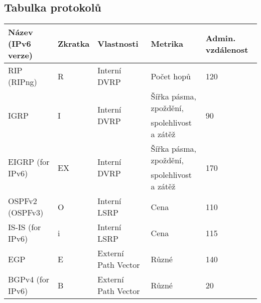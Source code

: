 \subsection{Tabulka protokolů}
\begin{tabularx}{\linewidth}{l|l|l|l|l}
  \textbf{Název (IPv6 verze)}           & \textbf{Zkratka}        & \textbf{Vlastnosti}               & \textbf{Metrika}       & \textbf{Admin. vzdálenost} \\
  \hline
  RIP (RIPng)                           & R                       & Interní DVRP                      & Počet hopů             & 120                        \\
  \hline
  \multirow{2}{8em}{{IGRP}}             & \multirow{2}{5em}{{I}}  & \multirow{2}{8em}{{Interní DVRP}} & Šířka pásma, zpoždění, & \multirow{2}{5em}{{90}}    \\
                                        &                         &                                   & spolehlivost a zátěž                                \\
  \hline
  \multirow{2}{8em}{{EIGRP (for IPv6)}} & \multirow{2}{5em}{{EX}} & \multirow{2}{8em}{{Interní DVRP}} & Šířka pásma, zpoždění, & \multirow{2}{5em}{{170}}   \\
                                        &                         &                                   & spolehlivost a zátěž                                \\
  \hline
  OSPFv2 (OSPFv3)                       & O                       & Interní LSRP                      & Cena                   & 110                        \\
  \hline
  IS-IS (for IPv6)                      & i                       & Interní LSRP                      & Cena                   & 115                        \\
  \hline
  EGP                                   & E                       & Externí Path Vector               & Různé                  & 140                        \\
  \hline
  BGPv4 (for IPv6)                      & B                       & Externí Path Vector               & Různé                  & 20                         \\
\end{tabularx}
